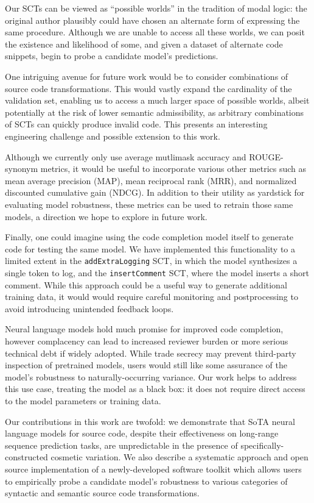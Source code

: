\documentclass[usenames,dvipsnames]{article} %
\begin{document}
Our SCTs can be viewed as ``possible worlds'' in the tradition of modal logic: the original author plausibly could have chosen an alternate form of expressing the same procedure. Although we are unable to access all these worlds, we can posit the existence and likelihood of some, and given a dataset of alternate code snippets, begin to probe a candidate model's predictions.

One intriguing avenue for future work would be to consider combinations of source code transformations. This would vastly expand the cardinality of the validation set, enabling us to access a much larger space of possible worlds, albeit potentially at the risk of lower semantic admissibility, as arbitrary combinations of SCTs can quickly produce invalid code. This presents an interesting engineering challenge and possible extension to this work.

Although we currently only use average mutlimask accuracy and ROUGE-synonym metrics, it would be useful to incorporate various other metrics such as mean average precision (MAP), mean reciprocal rank (MRR), and normalized discounted cumulative gain (NDCG). In addition to their utility as yardstick for evaluating model robustness, these metrics can be used to retrain those same models, a direction we hope to explore in future work.

Finally, one could imagine using the code completion model itself to generate code for testing the same model. We have implemented this functionality to a limited extent in the \lstinline|addExtraLogging| SCT, in which the model synthesizes a single token to log, and the \lstinline|insertComment| SCT, where the model inserts a short comment. While this approach could be a useful way to generate additional training data, it would would require careful monitoring and postprocessing to avoid introducing unintended feedback loops.

Neural language models hold much promise for improved code completion, however complacency can lead to increased reviewer burden or more serious technical debt if widely adopted. While trade secrecy may prevent third-party inspection of pretrained models, users would still like some assurance of the model's robustness to naturally-occurring variance. Our work helps to address this use case, treating the model as a black box: it does not require direct access to the model parameters or training data.

Our contributions in this work are twofold: we demonstrate that SoTA neural language models for source code, despite their effectiveness on long-range sequence prediction tasks, are unpredictable in the presence of specifically-constructed cosmetic variation. We also describe a systematic approach and open source implementation of a newly-developed software toolkit which allows users to empirically probe a candidate model's robustness to various categories of syntactic and semantic source code transformations.
\pagebreak

\appendix
\end{document}
